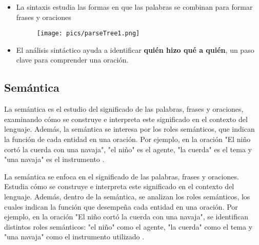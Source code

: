 \documentclass{book}
\begin{document}
\begin{itemize}
\item La sintaxis estudia las formas en que las palabras se combinan para formar frases y oraciones \cite{JohnsonMLSS}
\begin{figure}[h]
\texttt{[image: pics/parseTree1.png]}
\end{figure}
\item El análisis sintáctico ayuda a identificar \textbf{quién hizo qué a quién}, un paso clave para comprender una oración.
\end{itemize}


\subsection{Semántica}

La semántica es el estudio del significado de las palabras, frases y oraciones, examinando cómo se construye e interpreta este significado en el contexto del lenguaje. Además, la semántica se interesa por los roles semánticos, que indican la función de cada entidad en una oración. Por ejemplo, en la oración "El niño cortó la cuerda con una navaja", "el niño" es el agente, "la cuerda" es el tema y "una navaja" es el instrumento \cite{JohnsonMLSS}.

La semántica se enfoca en el significado de las palabras, frases y oraciones. Estudia cómo se construye e interpreta este significado en el contexto del lenguaje. Además, dentro de la semántica, se analizan los roles semánticos, los cuales indican la función que desempeña cada entidad en una oración. Por ejemplo, en la oración "El niño cortó la cuerda con una navaja", se identifican distintos roles semánticos: "el niño" como el agente, "la cuerda" como el tema y "una navaja" como el instrumento utilizado \cite{JohnsonMLSS}.
\end{document}
